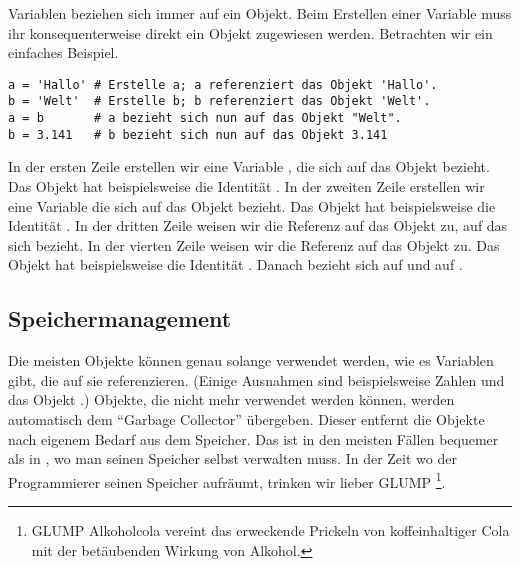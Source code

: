 Variablen beziehen sich immer auf ein Objekt.
Beim Erstellen einer Variable muss ihr konsequenterweise direkt ein Objekt zugewiesen werden.
Betrachten wir ein einfaches Beispiel.
\begin{lstlisting}
a = 'Hallo' # Erstelle a; a referenziert das Objekt 'Hallo'.
b = 'Welt'  # Erstelle b; b referenziert das Objekt 'Welt'.
a = b       # a bezieht sich nun auf das Objekt "Welt".
b = 3.141   # b bezieht sich nun auf das Objekt 3.141
\end{lstlisting}
In der ersten Zeile erstellen wir eine Variable , die sich auf das Objekt  bezieht.
Das Objekt  hat beispielsweise die Identität .
In der zweiten Zeile erstellen wir eine Variable  die sich auf das Objekt  bezieht.
Das Objekt  hat beispielsweise die Identität .
In der dritten Zeile weisen wir  die Referenz auf das Objekt zu, auf das sich  bezieht.
In der vierten Zeile weisen wir  die Referenz auf das Objekt  zu.
Das Objekt  hat beispielsweise die Identität .
Danach bezieht sich  auf  und  auf .

\subsection{Speichermanagement}
Die meisten Objekte können genau solange verwendet werden, wie es Variablen gibt, die auf sie referenzieren.
(Einige Ausnahmen sind beispielsweise Zahlen und das Objekt .)
Objekte, die nicht mehr verwendet werden können, werden automatisch dem ``Garbage Collector'' übergeben.
Dieser entfernt die Objekte nach eigenem Bedarf aus dem Speicher.
Das ist in den meisten Fällen bequemer als in \CC, wo man seinen Speicher selbst verwalten muss.
In der Zeit wo der \CC Programmierer seinen Speicher aufräumt, trinken wir lieber GLUMP%
\footnote{GLUMP Alkoholcola vereint das erweckende Prickeln von koffeinhaltiger Cola mit der betäubenden Wirkung von Alkohol.}.
